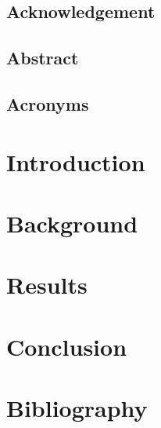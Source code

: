 \documentclass[openany,12pt,oneside]{extreport}
\begin{document}



\chapter*{Acknowledgement}


\chapter*{Abstract}


\chapter*{Acronyms}


\clearpage
\tableofcontents
\listoffigures
\listoftables

\clearpage
{}
\setcounter{part}{0}

\part{Introduction}


\part{Background}




\part{Results}


\part{Conclusion}


\part{Bibliography}
\printbibliography
\end{document}
